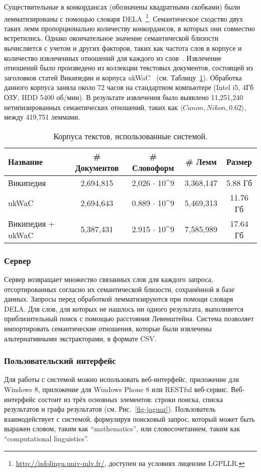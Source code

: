 \documentclass[a4paper,10pt,twoside]{article}
\begin{document}
Существительные в конкордансах (обозначены квадратными скобками) были лемматизированы с помощью словаря DELA~\footnote{\url{http://infolingu.univ-mlv.fr/}, доступен на условиях лицензии LGPLLR.}. Семантическое сходство двух таких лемм пропорционально количеству конкордансов, в которых они совместно встретились. Однако окончательное значение семантической близости вычисляется с учетом и других факторов, таких как частота слов в корпусе и количество извлеченных отношений для каждого из слов~\cite{panchenko2012konvens}. Извлечение отношений было произведено из коллекции текстовых документов, состоящей из заголовков статей Википедии и корпуса ukWaC~\cite{baroni2009wacky} (см. Таблицу~\ref{tbl:corpora}). Обработка данного корпуса заняла около 72 часов на стандартном компьютере (Intel i5, 4Гб ОЗУ, HDD 5400 об/мин). В результате извлечения было выявлено 11,251,240 нетипизированных семантических отношений, таких как  $\langle Canon, Nikon, 0.62 \rangle$, между 419,751 леммами. 

\begin{table}
\centering
\footnotesize
\begin{tabular}{|l|c|c|c|c|}
  \hline              
  Название & \# Документов & \# Словоформ & \# Лемм &  Размер \\ \hline         \hline           
  Википедия & 2,694,815 & 2,026 $\cdot$ 10^9 & 3,368,147 & 5.88 Гб \\
  ukWaC & 2,694,643 & 0.889 $\cdot$ 10^9 & 5,469,313 & 11.76 Гб \\ 
  Википедия + ukWaC & 5,387,431 & 2.915 $\cdot$ 10^9 & 7,585,989 & 17.64 Гб\\
  \hline  
\end{tabular}
\caption{Корпуса текстов, использованные системой.}
\label{tbl:corpora}
\end{table}

\subsubsection{Сервер} Сервер возвращает множество связанных слов для каждого запроса, отсортированных согласно их семантической близости, сохранённой в базе данных. Запросы перед обработкой лемматизируются при помощи словаря DELA. Для слов, для которых не нашлось ни одного результата, выполняется приблизительный поиск с помощью расстояния Левенштейна. Система позволяет импортировать семантические отношения, которые были извлечены альтернативными экстракторами, в формате CSV.

\subsubsection{Пользовательский интерфейс} Для работы с системой можно использовать веб-интерфейс, приложение для Windows 8, приложение для Windows Phone 8 или RESTful веб-сервис. Веб-интерфейс состоит из трёх основных элементов: строки поиска, списка результатов и графа результатов (см. Рис.~\ref{fig-jaguar}). Пользователь взаимодействует с системой, формулируя поисковый запрос, который может быть выражен словом, таким как ``mathematics'', или словосочетанием, таким как ``computational linguistics''. 
\end{document}
